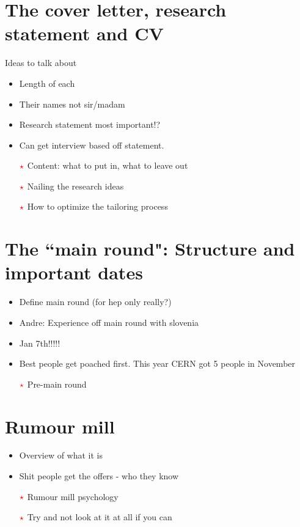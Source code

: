 \documentclass[10pt]{beamer}
\begin{document}
\section{The cover letter, research statement and CV}
\begin{frame}
Ideas to talk about
\begin{itemize}
	\item Length of each
	\item Their names not sir/madam
	\item Research statement most important!?
	\item Can get interview based off statement.
	\item [{$\color{red}\star$}] Content: what to put in, what to leave out
	\item [{$\color{red}\star$}] Nailing the research ideas
	\item [{$\color{red}\star$}] How to optimize the tailoring process
\end{itemize}

\end{frame}
\section{The ``main round": Structure and important dates}
\begin{frame}
	\begin{itemize}
		\item Define main round (for hep only really?)
		\item Andre: Experience off main round with slovenia 
		\item Jan 7th!!!!!
		\item Best people get poached first. This year CERN got 5 people in November
		\item [{$\color{red}\star$}] Pre-main round
	\end{itemize}
\end{frame}


\section{Rumour mill}
\begin{frame}
\begin{itemize}
	\item Overview of what it is
		\item Shit people get the offers  - who they know 
		\item [{$\color{red}\star$}] Rumour mill psychology

		\item [{$\color{red}\star$}] Try and not look at it at all if you can
\end{itemize}
\end{frame}
\end{document}
